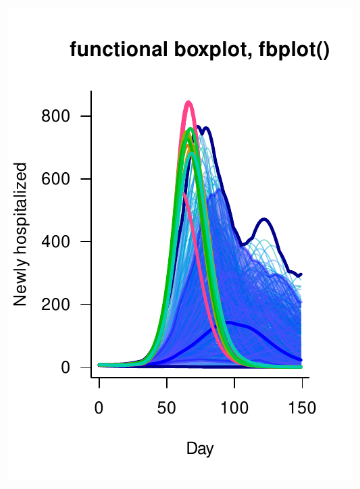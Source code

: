 \documentclass[12pt]{article}
\theoremstyle{definition} %
\begin{document}
\begin{figure}[h!]
\begin{subfigure}[t]{.45\textwidth}
\includegraphics[width=\linewidth]{scripts/pix/fbplot_juul.pdf}
\caption{}\label{p.b}
\end{subfigure}
%
\begin{subfigure}[t]{.45\textwidth}
\centering

\end{subfigure}
\end{figure}
\end{document}
